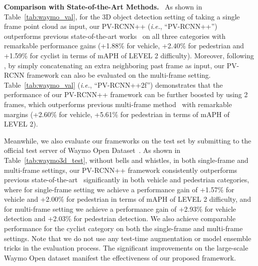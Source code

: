 \documentclass[natbib,twocolumn]{svjour3}          \smartqed  \usepackage{graphicx}
\begin{document}
\noindent
\textbf{Comparison with State-of-the-Art Methods.}~
As shown in Table~\ref{tab:waymo_val}, 
for the 3D object detection setting of taking a single frame point cloud as input, 
our PV-RCNN++ (\emph{i.e.}, ``PV-RCNN++'') outperforms previous state-of-the-art works~\citep{yin2021center,shi2020part} 
on all three categories with remarkable performance gains (+1.88\% for vehicle, 
+2.40\% for pedestrian and 
+1.59\% for cyclist
in terms of mAPH of LEVEL 2 difficulty).
Moreover, following \citep{sun2021rsn}, by simply concatenating an extra neighboring past frame as input, our PV-RCNN framework can also be evaluated on the multi-frame setting. Table~\ref{tab:waymo_val} (\emph{i.e.}, ``PV-RCNN++2f'') demonstrates that the performance of our PV-RCNN++ framework can be further boosted by using 2 frames, which outperforms previous multi-frame method~\citep{sun2021rsn} with remarkable margins (+2.60\% for vehicle, +5.61\% for pedestrian in terms of mAPH of LEVEL 2). 
 
Meanwhile, we also evaluate our frameworks on the test set by submitting to the official test server of Waymo Open Dataset~\citep{Sun_2020_CVPR}. As shown in Table~\ref{tab:waymo3d_test}, without bells and whistles, in both single-frame and multi-frame settings, our PV-RCNN++ framework consistently outperforms previous state-of-the-art~\citep{yin2021center} significantly in both vehicle and pedestrian categories, where for single-frame setting we achieve a performance gain of 
+1.57\% for vehicle and +2.00\% for pedestrian 
in terms of mAPH of LEVEL 2 difficulty, and for multi-frame setting we achieve a performance gain of +2.93\% for vehicle detection and +2.03\% for pedestrian detection. 
We also achieve comparable performance for the cyclist category on both the single-frame and multi-frame settings.
Note that we do not use any test-time augmentation or model ensemble tricks in the evaluation process. 
The significant improvements on the large-scale Waymo Open dataset manifest the effectiveness of our proposed framework. 

 
\end{document}
